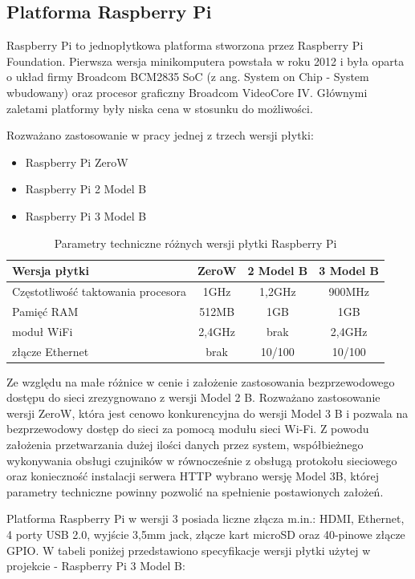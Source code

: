 \subsection{Platforma Raspberry Pi}

Raspberry Pi to jednopłytkowa platforma stworzona przez Raspberry Pi Foundation. Pierwsza wersja minikomputera powstała w roku 2012 i była oparta o układ firmy Broadcom BCM2835 SoC (z ang. System on Chip - System wbudowany) oraz procesor graficzny Broadcom VideoCore IV. Głównymi zaletami platformy były niska cena w stosunku do możliwości.

Rozważano zastosowanie w pracy jednej z trzech wersji płytki:
\begin{itemize}
\item Raspberry Pi ZeroW
\item Raspberry Pi 2 Model B
\item Raspberry Pi 3 Model B 
\end{itemize}

\begin{table}[h]
\label{tabRpi}
\centering
\begin{tabular}{|l|c|c|c|}
  \hline 
  Wersja płytki & ZeroW & 2 Model B & 3 Model B\\
  \hline
  Częstotliwość taktowania procesora &1GHz&1,2GHz&900MHz\\
  \hline
  Pamięć RAM&512MB&1GB&1GB\\
  \hline
 moduł WiFi & 2,4GHz & brak & 2,4GHz\\
  \hline
  złącze Ethernet & brak &10/100& 10/100\\
  \hline
\end{tabular}
\caption{Parametry techniczne różnych wersji płytki Raspberry Pi
\cite{rpispecs}
} 
\end{table}

Ze względu na małe różnice w cenie i założenie zastosowania bezprzewodowego dostępu do sieci zrezygnowano z wersji Model 2 B. Rozważano zastosowanie wersji ZeroW, która jest cenowo konkurencyjna do wersji Model 3 B i pozwala na bezprzewodowy dostęp do sieci za pomocą modułu sieci Wi-Fi. Z powodu założenia przetwarzania dużej ilości danych przez system, współbieżnego wykonywania obsługi czujników
w równocześnie z obsługą protokołu sieciowego oraz konieczność instalacji serwera HTTP wybrano wersję Model 3B, której parametry techniczne powinny pozwolić na spełnienie postawionych założeń.

Platforma Raspberry Pi w wersji 3 posiada liczne złącza m.in.: HDMI, Ethernet, 4 porty USB 2.0, wyjście 3,5mm jack, złącze kart microSD oraz 40-pinowe złącze GPIO. W tabeli poniżej przedstawiono specyfikacje wersji płytki użytej w projekcie - Raspberry Pi 3 Model B:

